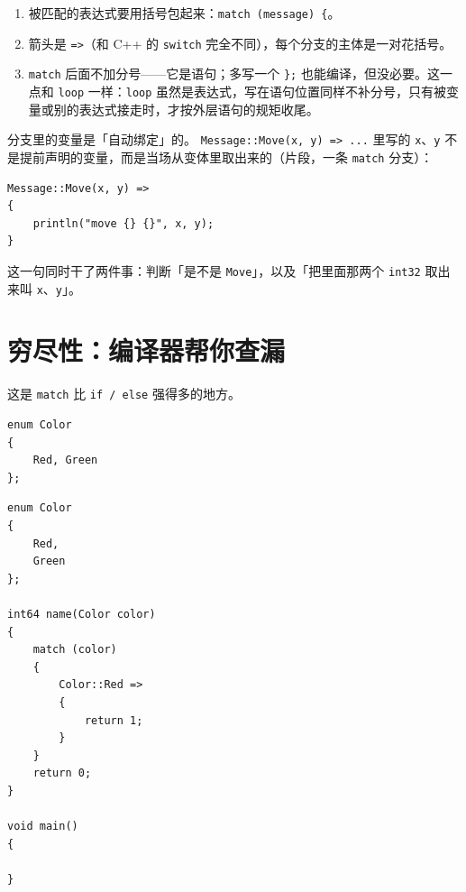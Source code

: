 \begin{enumerate}

\item 被匹配的表达式要用括号包起来：\texttt{match (\allowbreak{}message)\allowbreak{} \{}。

\item 箭头是 \texttt{=\allowbreak{}>\allowbreak{}}（和 C++ 的 \texttt{switch} 完全不同），每个分支的主体是一对花括号。

\item \texttt{match} 后面不加分号——它是语句；多写一个 \texttt{\};} 也能编译，但没必要。这一点和 \texttt{loop} 一样：\texttt{loop} 虽然是表达式，写在语句位置同样不补分号，只有被变量或别的表达式接走时，才按外层语句的规矩收尾。

\end{enumerate}

分支里的变量是「自动绑定」的。 \texttt{Message:\allowbreak{}:\allowbreak{}Move(\allowbreak{}x,\allowbreak{} y)\allowbreak{} =\allowbreak{}>\allowbreak{} .\allowbreak{}.\allowbreak{}.\allowbreak{}} 里写的 \texttt{x}、\texttt{y} 不是提前声明的变量，而是当场从变体里取出来的（片段，一条 \texttt{match} 分支）：

\par
\medskip
\begin{lstlisting}[style=chali]
Message::Move(x, y) =>
{
    println("move {} {}", x, y);
}
\end{lstlisting}
\par
\medskip

这一句同时干了两件事：判断「是不是 \texttt{Move}」，以及「把里面那两个 \texttt{int32} 取出来叫 \texttt{x}、\texttt{y}」。

\section{穷尽性：编译器帮你查漏}

这是 \texttt{match} 比 \texttt{if /\allowbreak{} else} 强得多的地方。

\par
\medskip
\begin{lstlisting}[style=chali]
enum Color
{
    Red, Green
};
\end{lstlisting}
\par
\medskip

\par
\medskip
\begin{lstlisting}[style=chali]
enum Color
{
    Red,
    Green
};

int64 name(Color color)
{
    match (color)
    {
        Color::Red =>
        {
            return 1;
        }
    }
    return 0;
}

void main()
{

}
\end{lstlisting}
\par
\medskip


